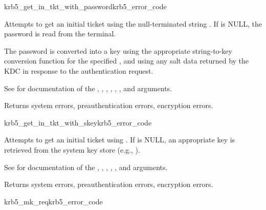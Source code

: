 \begin{funcdecl}{krb5_get_in_tkt_with_password}{krb5_error_code}{\funcin}
\funcinout
{}
\end{funcdecl}

Attempts to get an initial ticket using the null-terminated string
.  If  is NULL, the password
is read from the terminal.

The password is converted into a key using the appropriate
string-to-key conversion function for the specified
, and using any salt data returned by the KDC in
response to the authentication request.

See  for documentation of the
, , ,
, , ,
 and  arguments.

Returns system errors, preauthentication errors, encryption errors.

\begin{funcdecl}{krb5_get_in_tkt_with_skey}{krb5_error_code}{\funcin}
\funcinout
{}
\end{funcdecl}

Attempts to get an initial ticket using .  If
 is NULL, an appropriate key is retrieved from the
system key store (e.g., ).

See  for documentation of the
, , ,
, ,  and
 arguments.

Returns system errors, preauthentication errors, encryption errors.

\begin{funcdecl}{krb5_mk_req}{krb5_error_code}{\funcin}
\funcout
{}
\end{funcdecl}


